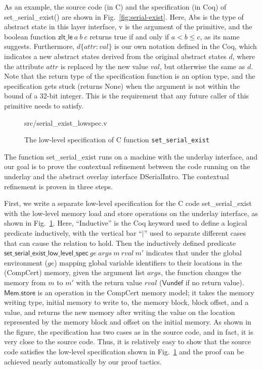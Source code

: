 As an example, the source code (in C) and the specification (in Coq) of
\textsf{set\_serial\_exist()} are shown in Fig.~\ref{fig:serial-exist}.
Here, \textsf{Abs} is the type of abstract state in this layer interface,
\textsf{v} is the argument of the primitive, and the boolean function
$\textsf{zlt\_le}~a~b~c$ returns true if and only if $a< b\le c$, as
its name suggests. Furthermore, $d\{attr:val\}$ is our own notation
defined in the Coq, which indicates a new abstract states derived
from the original abstract states $d$, where the attribute $attr$ is
replaced by the new value $val$, but otherwise the same as $d$.
Note that the return type of the
specification function is an option type, and the specification gets stuck
(returns \textsf{None}) when the argument is not within the bound of a 32-bit
integer. This is the requirement that any future caller of this primitive needs
to satisfy.

\begin{figure}
	 {src/serial_exist_lowspec.v}
	\caption{The low-level specification of C function \texttt{set\_serial\_exist}}
	\label{fig:serial-exist-lowspec}
\end{figure}
 
The function \textsf{set\_serial\_exist} runs on a machine with the
underlay interface, and our goal is to prove the contextual refinement between
the code running on the underlay and the abstract overlay interface
DSerialIntro. The contextual refinement is proven in three steps.

First, we write a separate low-level specification for the C code
\textsf{set\_serial\_exist} with the low-level memory load and store operations
on the underlay interface, as shown in Fig.~\ref{fig:serial-exist-lowspec}.
Here, ``Inductive'' is the Coq keyword used to define a logical predicate
inductively, with the vertical bar ``$|$'' used to separate different cases
that can cause the relation to hold.
Then the inductively defined predicate
$\textsf{set\_serial\_exist\_low\_level\_spec}~ ge~ args~ m~ rval~ m'$
indicates that under the global environment ($ge$) mapping global variable
identifiers to their locations in the (CompCert) memory, given the argument list
$args$, the function changes the memory from $m$ to $m'$ with the return value
$rval$ ($\textsf{Vundef}$ if no return value). $\textsf{Mem.store}$ is an
operation in the CompCert memory model;  it takes the memory writing type, initial
memory to write to, the memory block, block offset, and a value, and returns the
new memory after writing the value on the location represented by the memory
block and offset on the initial memory. As shown in the figure, the
specification has two cases as in the source code, and in fact, it is very close
to the source code. Thus, it is relatively easy to show that the source code
satisfies the low-level specification shown in
Fig.~\ref{fig:serial-exist-lowspec} and the proof can be achieved nearly
automatically by our proof tactics.

